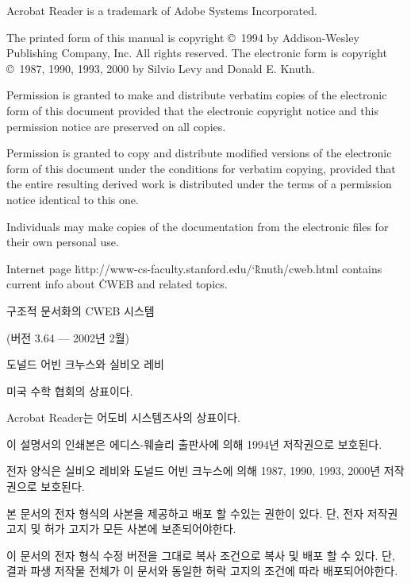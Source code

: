 \noindent
Acrobat Reader is a trademark of Adobe Systems Incorporated.

\bigskip\noindent
The printed form of this manual is copyright \copyright\ 1994
  by Addison-Wesley Publishing Company, Inc.  All rights reserved.
\smallskip\noindent
The electronic form is copyright \copyright\ 1987, 1990, 1993, 2000
  by Silvio Levy and Donald E. Knuth.

\bigskip\noindent
Permission is granted to make and distribute verbatim copies of the
electronic form of this document provided that the electronic copyright
notice and this permission notice are preserved on all copies.

\smallskip\noindent
Permission is granted to copy and distribute modified versions of the
electronic form of this document under the conditions for verbatim copying,
provided that the entire resulting derived work is distributed under the terms
of a permission notice identical to this one.

\smallskip\noindent
Individuals may make copies of the documentation from the electronic files
for their own personal use.

\smallskip\noindent
Internet page \.{http://www-cs-faculty.stanford.edu/\char`\~knuth/cweb.html}
contains current info about \.{CWEB} and related topics.

 \titletrue\eject


\null\vfill
\baselineskip 15pt

\centerline{\titlefont 구조적 문서화의 {\ttitlefont CWEB} 시스템}
\vskip 18pt\centerline{(버전 3.64 --- 2002년 2월)}
\vskip 24pt
\centerline{ 도널드 어빈 크누스와 실비오 레비}
\vfill

\noindent
{} 미국 수학 협회의 상표이다.

\noindent
Acrobat Reader는 어도비 시스템즈사의 상표이다.

\bigskip\noindent
이 설명서의 인쇄본은 에디스-웨슬리 출판사에 의해 1994년 저작권으로 보호된다.

\smallskip\noindent
전자 양식은 실비오 레비와 도널드 어빈 크누스에 의해 1987, 1990, 1993, 2000년 저작권으로
보호된다.

\bigskip\noindent
본 문서의 전자 형식의 사본을 제공하고 배포 할 수있는 권한이 있다. 단, 전자 저작권 고지 및
허가 고지가 모든 사본에 보존되어야한다.

\smallskip\noindent
이 문서의 전자 형식 수정 버전을 그대로 복사 조건으로 복사 및 배포 할 수 있다.
단, 결과 파생 저작물 전체가 이 문서와 동일한 허락 고지의 조건에 따라 배포되어야한다.


